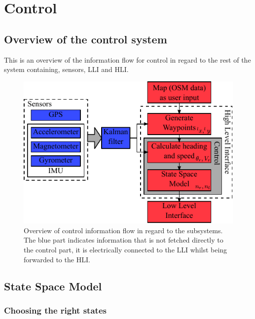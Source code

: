 \chapter{Control}
\label{chap:control}

\section{Overview of the control system}
This is an overview of the information flow for control in regard to the rest of the system containing, sensors, \ac{LLI} and \ac{HLI}.

\begin{figure}[htbp]
	\centering
	\includegraphics[width=\textwidth]{img/vessel-block-overview}
	\caption{Overview of control information flow in regard to the subsystems. The blue part indicates information that is not fetched directly to the control part, it is electrically connected to the \ac{LLI} whilst being forwarded to the \ac{HLI}.}
	\label{fig:vessel-block-overview}
\end{figure}


\section{State Space Model}
\subsection{Choosing the right states}

